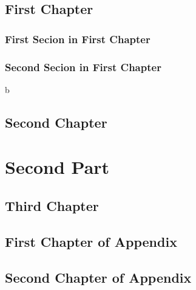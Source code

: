 \documentclass[10pt]{book}
\begin{document}
\chapter{First Chapter}
\blindtext[2]
\section{First Secion in First Chapter}
\blindtext[10]
\section{Second Secion in First Chapter}b
\blindtext[15]

\chapter{Second Chapter}
\blindtext[25]

\part{Second Part}
\chapter{Third Chapter}
\blindtext

\appendix
\chapter{First Chapter of Appendix}
\blindtext

\chapter{Second Chapter of Appendix}
\blindtext

\backmatter

\tocbibliography
\end{document}
